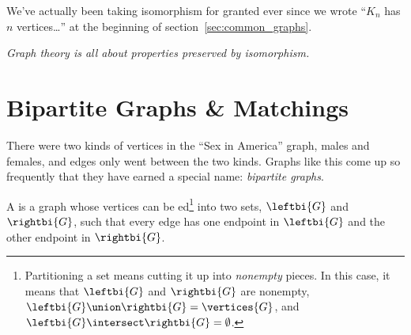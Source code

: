 We've actually been taking isomorphism for granted ever since we wrote
``$K_n$ has $n$ vertices\dots'' at the beginning of
section~\ref{sec:common_graphs}.  

\iffalse
A pickier sentence is ``Any graph isomorphic to some graph
that is a $K_n$ has $n$ vertices\dots.''  But since having $n$
vertices is a property preserved by isomorphism, the picky version is
unnecessary if not silly.
\fi

\emph{Graph theory is all about properties preserved by isomorphism.}

\begin{problems}
\classproblems
{}

\homeworkproblems
{}

\examproblems
{}
\end{problems}


\section{Bipartite Graphs \& Matchings}\label{bipartitesec}


There were two kinds of vertices in the ``Sex in America'' graph,
males and females, and edges only went between the two kinds.  Graphs
like this come up so frequently that they have earned a special
name: \emph{bipartite graphs}.

\begin{definition}
  A   is a graph whose vertices can be
  ed\footnote{Partitioning a set means cutting it up into
    \emph{nonempty} pieces.  In this case, it means that $\leftbi{G}$ and
    $\rightbi{G}$ are nonempty, $\leftbi{G} \union \rightbi{G} =
    \vertices{G}$, and $\leftbi{G} \intersect \rightbi{G} =
    \emptyset$.} into two sets, $\leftbi{G}$ and
    $\rightbi{G}$, such that every edge has one endpoint in
    $\leftbi{G}$ and the other endpoint in $\rightbi{G}$.
\end{definition}

